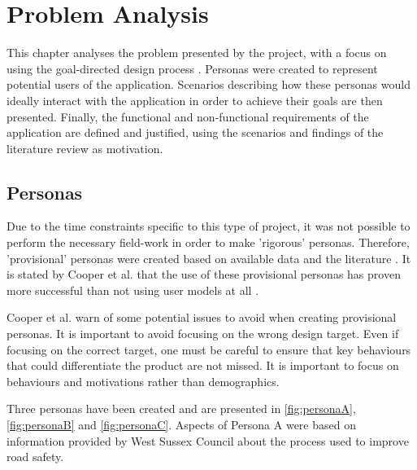 \documentclass[authoryearcitations]{UoYCSproject}
\begin{document}
\chapter{Problem Analysis}

This chapter analyses the problem presented by the project, with a focus on using the goal-directed design process \citep{Cooper2007}. Personas were created to represent potential users of the application. Scenarios describing how these personas would ideally interact with the application in order to achieve their goals are then presented. Finally, the functional and non-functional requirements of the application are defined and justified, using the scenarios and findings of the literature review as motivation. 

\section{Personas} 

Due to the time constraints specific to this type of project, it was not possible to perform the necessary field-work in order to make 'rigorous' personas. Therefore, 'provisional' personas were created based on available data and the literature \citep{Venkatesh2003} \citep{Davis1986}. It is stated by Cooper et al. that the use of these provisional personas has proven more successful than not using user models at all \citep{Cooper2007}. 

Cooper et al. warn of some potential issues to avoid when creating provisional personas. It is important to avoid focusing on the wrong design target. Even if focusing on the correct target, one must be careful to ensure that key behaviours that could differentiate the product are not missed. It is important to focus on behaviours and motivations rather than demographics.

Three personas have been created and are presented in \autoref{fig:personaA}, \autoref{fig:personaB} and \autoref{fig:personaC}. Aspects of Persona A were based on information provided by West Sussex Council about the process used to improve road safety\citep{WestSussexCountyCouncil}.
\end{document}
